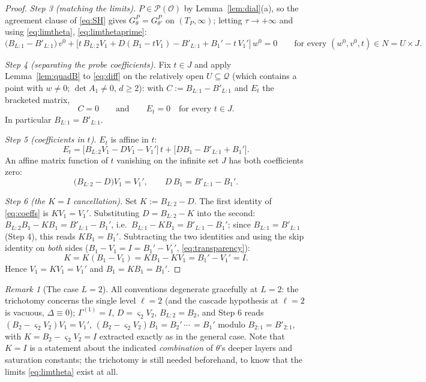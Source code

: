 \documentclass[11pt]{article}
\theoremstyle{definition}
\theoremstyle{remark}
\newtheorem{remark}[theorem]{Remark}
\theoremstyle{plain}
\newcommand{\cO}{\mathcal{O}}
\newcommand{\cP}{\mathcal{P}}
\newcommand{\cQ}{\mathcal{Q}}
\begin{document}
\begin{proof}
\emph{Step 3 (matching the limits).}  $P\in\cP(\cO)$ by Lemma~\ref{lem:dial}(a), so
the agreement clause of \eqref{eq:SH} gives $G^P_\theta=G^P_{\theta'}$ on
$(T_P,\infty)$; letting $\tau\to+\infty$ and using
\eqref{eq:limtheta}, \eqref{eq:limthetaprime}:
\begin{equation}\label{eq:diff}
\big(B_{L:1}-B'_{L:1}\big)\,v^0
+\Big[t\,B_{L:2}V_1+D(B_1-tV_1)-B'_{L:1}+B_1'-t\,V_1'\Big]\,w^0=0
\qquad\text{for every }(w^0,v^0,t)\in N=U\times J .
\end{equation}

\emph{Step 4 (separating the probe coefficients).}  Fix $t\in J$ and apply
Lemma~\ref{lem:quadB} to \eqref{eq:diff} on the relatively open
$U\subseteq\cQ$ (which contains a point with $w\neq0$; $\det A_1\neq0$, $d\ge2$): with
$C:=B_{L:1}-B'_{L:1}$ and $E_t$ the bracketed matrix,
\[
C=0\qquad\text{and}\qquad E_t=0\quad\text{for every }t\in J .
\]
In particular $B_{L:1}=B'_{L:1}$.

\emph{Step 5 (coefficients in $t$).}  $E_t$ is affine in $t$:
\[
E_t=\big[B_{L:2}V_1-DV_1-V_1'\big]\,t+\big[DB_1-B'_{L:1}+B_1'\big].
\]
An affine matrix function of $t$ vanishing on the infinite set $J$ has both
coefficients zero:
\begin{equation}\label{eq:coeffs}
\big(B_{L:2}-D\big)V_1=V_1',
\qquad
D\,B_1=B'_{L:1}-B_1' .
\end{equation}

\emph{Step 6 (the $K=I$ cancellation).}  Set $K:=B_{L:2}-D$.  The first identity of
\eqref{eq:coeffs} is $KV_1=V_1'$.  Substituting $D=B_{L:2}-K$ into the second:
$B_{L:2}B_1-KB_1=B'_{L:1}-B_1'$, i.e.\ $B_{L:1}-KB_1=B'_{L:1}-B_1'$; since
$B_{L:1}=B'_{L:1}$ (Step 4), this reads $KB_1=B_1'$.  Subtracting the two identities
and using the skip identity on \emph{both} sides
($B_1-V_1=I=B_1'-V_1'$, \eqref{eq:transparency}):
\[
K=K(B_1-V_1)=KB_1-KV_1=B_1'-V_1'=I .
\]
Hence $V_1=KV_1=V_1'$ and $B_1=KB_1=B_1'$.
\end{proof}

\begin{remark}[The case $L=2$]\label{rem:L2}
All conventions degenerate gracefully at $L=2$: the trichotomy concerns the single
level $\ell=2$ (and the cascade hypothesis at $\ell=2$ is vacuous, $\Delta\equiv0$);
$\Gamma^{(1)}=I$, $D=\varsigma_2V_2$, $B_{L:2}=B_2$, and Step 6 reads
$(B_2-\varsigma_2V_2)V_1=V_1'$, $(B_2-\varsigma_2V_2)B_1=B_2'$\,$\cdots$\,$=B_1'$
modulo $B_{2:1}=B'_{2:1}$, with $K=B_2-\varsigma_2V_2=I$ extracted exactly as in the
general case.  Note that $K=I$ is a statement about the indicated \emph{combination}
of $\theta$'s deeper layers and saturation constants; the trichotomy is still needed
beforehand, to know that the limits \eqref{eq:limtheta} exist at all.
\end{remark}
\end{document}
